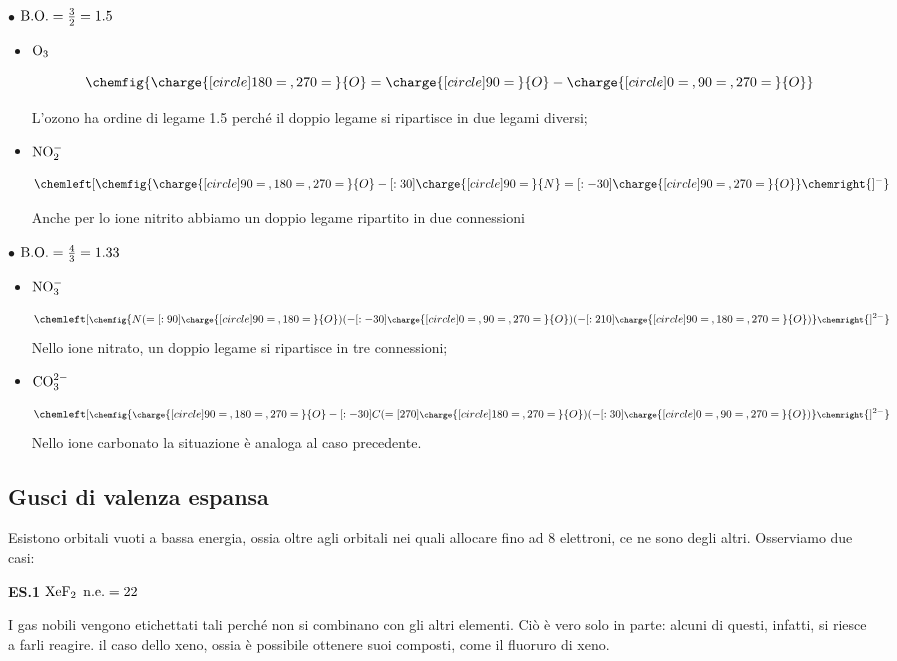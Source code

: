 $\bullet$ $\rm B.O.=\frac{3}{2}=1.5$
\begin{itemize}
    \item $\rm O_3$
    
    $$
    \chemfig{\charge{[circle]180=\:,270=\:}{O}=\charge{[circle]90=\:}{O}-\charge{[circle]0=\:,90=\:,270=\:}{O}}
    $$

    L'ozono ha ordine di legame 1.5 perché il doppio legame si ripartisce in due legami diversi;
    \item $\rm NO_2^-$
    
    $$
    \chemleft[ \chemfig{\charge{[circle]90=\:,180=\:,270=\:}{O}-[:30]\charge{[circle]90=\:}{N}=[:-30]\charge{[circle]90=\:,270=\:}{O}} \chemright{]^{-}}
    $$

    Anche per lo ione nitrito abbiamo un doppio legame ripartito in due connessioni
\end{itemize}

$\bullet$ $\rm B.O.=\frac{4}{3}=1.33$
\begin{itemize}
    \item $\rm NO_3^-$

    $$
    \chemleft[ \footnotesize\chemfig{N(=[:90]\charge{[circle]90=\:,180=\:}{O})(-[:-30]\charge{[circle]0=\:,90=\:,270=\:}{O})(-[:210]\charge{[circle]90=\:,180=\:,270=\:}{O})} \chemright{]^{2-}}
    $$
    Nello ione nitrato, un doppio legame si ripartisce in tre connessioni;
    \item $\rm CO_3^{2-}$
    
    $$
    \chemleft[ \footnotesize\chemfig{\charge{[circle]90=\:,180=\:,270=\:}{O}-[:-30]C(=[270]\charge{[circle]180=\:,270=\:}{O})(-[:30]\charge{[circle]0=\:,90=\:,270=\:}{O})} \chemright{]^{2-}}
    $$
    Nello ione carbonato la situazione è analoga al caso precedente.
\end{itemize}
\normalsize
\subsection{Gusci di valenza espansa}
Esistono orbitali vuoti a bassa energia, ossia oltre agli orbitali nei quali allocare fino ad 8 elettroni, ce ne sono degli altri. Osserviamo due casi:

\vspace{0.2cm}\textbf{ES.1} $\rm XeF_2$ $\rm n.e.=22$

I gas nobili vengono etichettati tali perché non si combinano con gli altri elementi. Ciò è vero solo in parte: alcuni di questi, infatti, si riesce a farli reagire. \E il caso dello xeno, ossia è possibile ottenere suoi composti, come il fluoruro di xeno.

